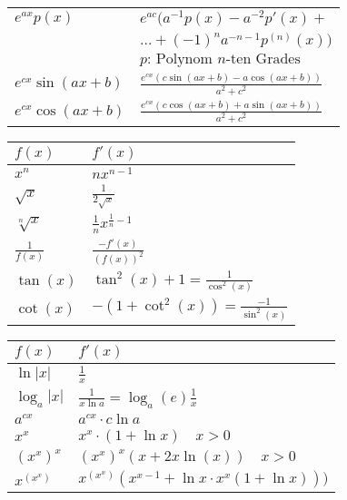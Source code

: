 \begin{tabular}{l|l}
		$ e^{ax} p(x) $  &  $ e^{ac} (  a^{-1} p(x) - a^{-2} p'(x)+ $ \\
		$  $  &  $ \ldots+(-1)^na^{-n-1}p^{(n)}(x) ) $ \\
		$  $  &  $ p\text{: Polynom }n\text{-ten Grades} $ \\
		$ \scriptstyle e^{cx} \sin (ax+b)  $  &  $ \frac{e^{cx} \left( c \sin (ax+b)-a \cos(ax+b) \right)}{a^2+c^2}  $ \\
		$ \scriptstyle e^{cx} \cos (ax+b)  $  &  $ \frac{e^{cx} \left( c \cos (ax+b)+a \sin(ax+b) \right)}{a^2+c^2}  $ \\
	\end{tabular}
	
	
	\renewcommand\arraystretch{1.4}
	\begin{tabular}{l|l}
		$f(x)$ & $f'(x)$ \\ \hline

		$ x^n $   &   $ nx^{n-1} $ \\
		$ \sqrt x $  &  $ \frac{1}{2 \sqrt x} $ \\
		$ \sqrt[n] x $  &  $ \frac{1}{n} {x}^{ \frac{1}{n} -1 } $ \\
		$ \frac{1}{f(x)} $  &  $ \frac{-f'(x)}{(f(x))^2} $ \\
		$ \tan(x) $  &  $ \tan^2(x)+1 = \frac{1}{\cos^2(x)} $ \\
		$ \cot(x) $  &  $ -(1 + \cot^2(x)) = \frac{-1}{\sin^2(x)} $
	\end{tabular}

	\hspace{-20pt}
	\begin{tabular}{l|l}
		$f(x)$ & $f'(x)$ \\ \hline
		
		$ \ln |x| $  &  $ \frac{1}{x} $ \\
		$ \log_a |x| $  &  $ \frac{1}{x \ln a} = \log_a(e) \frac{1}{x} $ \\
		$ a^{cx} $  &  $ a^{cx} \cdot c \ln a $ \\
		$ x^x $  &  $ x^x \cdot (1+\ln x) \quad \scriptstyle x > 0 $ \\
		$ (x^x)^x $  &  $ (x^x)^x(x+2x\ln(x)) \quad \scriptstyle x > 0 $ \\
		$ x^{(x^x)} $  &  $ x^{(x^x)}(x^{x-1}+\ln x \cdot x^x (1+\ln x))) $ 
	\end{tabular}